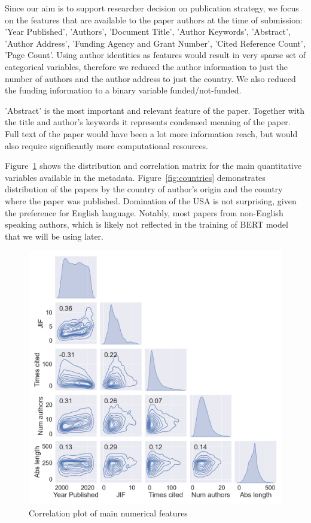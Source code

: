 \documentclass[11pt]{article}
\begin{document}
Since our aim is to support researcher decision on publication strategy, we focus on the features that are available to the paper authors at the time of submission: 'Year Published', 'Authors', 'Document Title', 'Author Keywords', 'Abstract', 'Author Address', 'Funding Agency and Grant Number', 'Cited Reference Count', 'Page Count'. Using author identities as features would result in very sparse set of categorical variables, therefore we reduced the author information to just the number of authors and the author address to just the country. We also reduced the funding information to a binary variable funded/not-funded.

'Abstract' is the most important and relevant feature of the paper. Together with the title and author's keywords it represents condensed meaning of the paper. Full text of the paper would have been a lot more information reach, but would also require significantly more computational resources. 

Figure~\ref{fig:paiplot} shows the distribution and correlation matrix for the main quantitative variables available in the metadata. Figure~\ref{fig:countries} demonstrates distribution of the papers by the country of author's origin and the country where the paper was published. Domination of the USA is not surprising, given the preference for English language. Notably, most papers from non-English speaking authors, which is likely not reflected in the training of BERT model that we will be using later.
\begin{figure}
	\includegraphics[width= \columnwidth]{./Images/Pairplot.png}
	\caption{Correlation plot of main numerical features}
	\label{fig:paiplot}
\end{figure}
\end{document}
